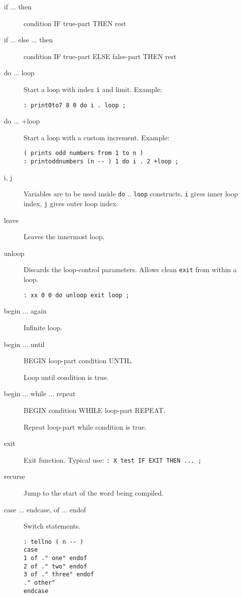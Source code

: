 \begin{description}
\item[if ... then]

condition IF true-part THEN rest

\item[if ... else ... then]

condition IF true-part ELSE false-part THEN rest

\item[do ... loop] Start a loop with index \texttt{i} and limit. Example:

\begin{verbatim}
: print0to7 8 0 do i . loop ;
\end{verbatim}

\item[do ... +loop] Start a loop with a custom increment. Example:

\begin{verbatim}
( prints odd numbers from 1 to n )
: printoddnumbers (n -- ) 1 do i . 2 +loop ;
\end{verbatim}

\item[i, j] Variables are to be used inside \texttt{do} .. \texttt{loop} constructs.
\texttt{i} gives inner loop index, \texttt{j} gives outer loop index.

\item[leave] Leaves the innermost loop.

\item[unloop] Discards the loop-control parameters. Allows clean \texttt{exit} from within a loop.

\begin{verbatim}
: xx 0 0 do unloop exit loop ;
\end{verbatim}

\item[begin ... again]

Infinite loop.

\item[begin ... until]

BEGIN loop-part condition UNTIL.

Loop until condition is true.

\item[begin ... while ... repeat]

BEGIN condition WHILE loop-part REPEAT.

Repeat loop-part while condition is true.

\item[exit]

Exit function. Typical use: \texttt{: X test IF EXIT THEN ... ;}

\item[recurse] Jump to the start of the word being compiled.

\item[case ... endcase, of ... endof] Switch statements.

\begin{verbatim}
: tellno ( n -- )
case
1 of ." one" endof
2 of ." two" endof
3 of ." three" endof
." other"
endcase
\end{verbatim}

\end{description}

